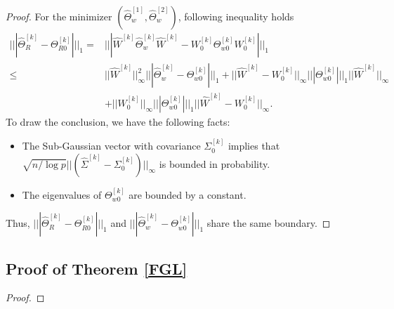 \documentclass[review]{elsarticle}
\newcommand{\1}{{\bf 1}}
\newcommand{\0}{{\bf 0}}
\newtheorem{proof}{Proof}
\begin{document}
\begin{appendices}
\begin{proof}
 For the minimizer $(\widehat{\Theta}_w^{[1]},\widehat{\Theta}_w^{[2]})$, following inequality holds
\begin{equation}\label{weiineq}
\begin{split}
|||\widehat{\Theta}_R^{[k]}-\Theta_{R0}^{[k]}|||_1
=&
|||\widehat{W}^{[k]}\widehat{\Theta}_w^{[k]}\widehat{W}^{[k]}
-W_0^{[k]}\Theta_{w0}^{[k]}W_0^{[k]}|||_1\\
\leq &||\widehat{W}^{[k]}||_{\infty}^2||| \widehat{\Theta}_w^{[k]}- \Theta_{w0}^{[k]} |||_1
+||  \widehat{W}^{[k]}- W_0^{[k]}  ||_{\infty}||| \Theta_{w0}^{[k]}  |||_1
|| \widehat{W}^{[k]} ||_{\infty}\\
&+|| W_0^{[k]}  ||_{\infty} |||  \Theta_{w0}^{[k]}  |||_1||  \widehat{W}^{[k]}- W_0^{[k]} ||_{\infty}.
\end{split}
\end{equation}
 To draw the conclusion, we have the following facts:
 \begin{itemize}
   \item The Sub-Gaussian vector with covariance $\Sigma_0^{[k]}$ implies that $\sqrt{n/\log{p}}||  (\widehat{\Sigma}^{[k]}-\Sigma_0^{[k]}) ||_{\infty}$ is bounded in probability.
   \item The eigenvalues of $\Theta_{w0}^{[k]}$ are bounded by a constant.
 \end{itemize}
  Thus, $|||\widehat{\Theta}_R^{[k]}-\Theta_{R0}^{[k]}|||_1$ and $||| \widehat{\Theta}_w^{[k]}- \Theta_{w0}^{[k]} |||_1$ share the same boundary.


\end{proof}

\subsection{Proof of Theorem \ref{FGL}}

\begin{proof}


\end{proof}
\end{appendices}
\end{document}
